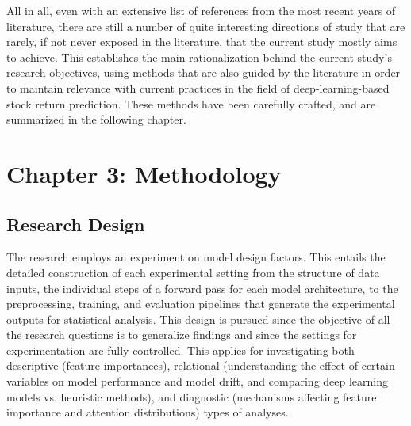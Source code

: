 \documentclass[stu,floatsintext]{apa7}
\begin{document}
All in all, even with an extensive list of references from the most recent years of literature, there are still a number of quite interesting directions of study that are rarely, if not never exposed in the literature, that the current study mostly aims to achieve. This establishes the main rationalization behind the current study's research objectives, using methods that are also guided by the literature in order to maintain relevance with current practices in the field of deep-learning-based stock return prediction. These methods have been carefully crafted, and are summarized in the following chapter.

\clearpage
\section{Chapter 3: Methodology}

\subsection{Research Design}

The research employs an experiment on model design factors. This entails the detailed construction of each experimental setting from the structure of data inputs, the individual steps of a forward pass for each model architecture, to the preprocessing, training, and evaluation pipelines that generate the experimental outputs for statistical analysis. This design is pursued since the objective of all the research questions is to generalize findings and since the settings for experimentation are fully controlled. This applies for investigating both descriptive (feature importances), relational (understanding the effect of certain variables on model performance and model drift, and comparing deep learning models vs. heuristic methods), and diagnostic (mechanisms affecting feature importance and attention distributions) types of analyses.
\end{document}
